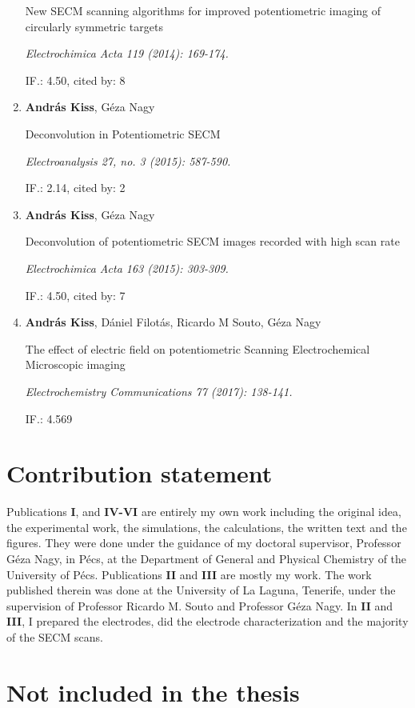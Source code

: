 \begin{enumerate}
New SECM scanning algorithms for improved potentiometric imaging of circularly symmetric targets 

\emph{Electrochimica Acta 119 (2014): 169-174.}

IF.: 4.50, cited by: 8

\item \textbf{András Kiss}, Géza Nagy

Deconvolution in Potentiometric SECM

\emph{Electroanalysis 27, no. 3 (2015): 587-590.}

IF.: 2.14, cited by: 2

\item \textbf{András Kiss}, Géza Nagy

Deconvolution of potentiometric SECM images recorded with high scan rate

\emph{Electrochimica Acta 163 (2015): 303-309.}

IF.: 4.50, cited by: 7

\item \textbf{András Kiss}, Dániel Filotás, Ricardo M Souto, Géza Nagy

The effect of electric field on potentiometric Scanning Electrochemical Microscopic imaging

\emph{Electrochemistry Communications 77 (2017): 138-141.}

IF.: 4.569

\end{enumerate}
\section*{Contribution statement}
Publications \textbf{I}, and \textbf{IV-VI} are entirely my own work including the original idea, the experimental work, the simulations, the calculations, the written text and the figures. They were done under the guidance of my doctoral supervisor, Professor Géza Nagy, in Pécs, at the Department of General and Physical Chemistry of the University of Pécs.
Publications \textbf{II} and \textbf{III} are mostly my work.
The work published therein was done at the University of La Laguna, Tenerife, under the supervision of Professor Ricardo M. Souto and Professor Géza Nagy.
In \textbf{II} and \textbf{III}, I prepared the electrodes, did the electrode characterization and the majority of the SECM scans. 

\newpage
\section*{Not included in the thesis}

